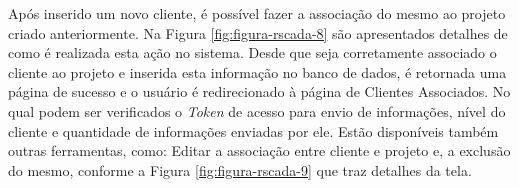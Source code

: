     	\begin{figure}[!h]
    	\end{figure}
    	
Após inserido um novo cliente, é possível fazer a associação do mesmo ao projeto criado anteriormente. Na Figura \ref{fig:figura-rscada-8} são apresentados detalhes de como é realizada esta ação no sistema. Desde que seja corretamente associado o cliente ao projeto e inserida esta informação no banco de dados, é retornada uma página de sucesso e o usuário é redirecionado à página de Clientes Associados. No qual podem ser verificados o \textit{Token} de acesso para envio de informações, nível do cliente e quantidade de informações enviadas por ele. Estão disponíveis também outras ferramentas, como: Editar a associação entre cliente e projeto e, a exclusão do mesmo, conforme a Figura \ref{fig:figura-rscada-9} que traz detalhes da tela.
    	
        \begin{figure}[!h]
    	\end{figure}

        \begin{figure}[!h]
    	\end{figure}
    	

